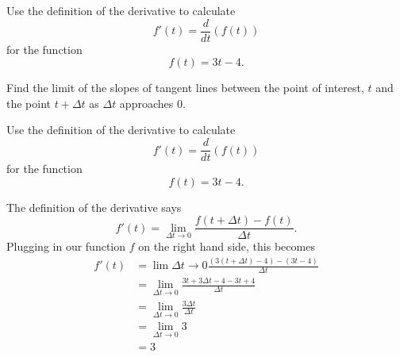 \documentclass{ximera}
\author{Emma Smith Zbarsky}
\begin{document}
\begin{exercise}

Use the definition of the derivative to calculate
\[f'(t) = \frac{d}{dt}(f(t))\] for the function \[f(t) = 3t-4.\]


\begin{hint}
Find the limit of the slopes of tangent lines between the point of
interest, $t$ and the point $t+\Delta t$ as $\Delta t$ approaches 0.
\end{hint}


\begin{hint}
Use the definition of the derivative to calculate
\[f'(t) = \frac{d}{dt}(f(t))\] for the function \[f(t) = 3t-4.\]

The definition of the derivative says
\[f'(t) = \lim_{\Delta t \to 0} \frac{f(t+\Delta t)-f(t)}{\Delta t}.\]
Plugging in our function $f$ on the right hand side, this becomes
\begin{align*} f'(t) & = \lim{\Delta t \to 0} \frac{\left(3(t+\Delta t)-4\right)-\left(3t-4\right)}{\Delta t} \\
&= \lim_{\Delta t \to 0} \frac{3t+3\Delta t - 4 - 3t +4}{\Delta t} \\
&= \lim_{\Delta t \to 0} \frac{3\Delta t}{\Delta t} \\
&= \lim_{\Delta t \to 0} 3 
\\ & = \boxed{3}\end{align*}
\end{hint}


\begin{multipleChoice}
\end{multipleChoice}

\end{exercise}
\end{document}
